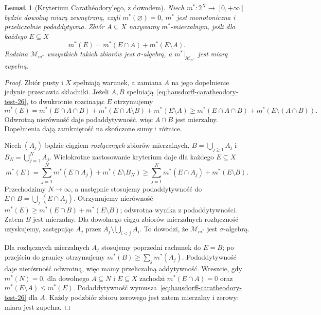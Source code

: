 \documentclass[11pt,a4paper,oneside]{book}
\numberwithin{equation}{chapter}
\theoremstyle{plain}
\newtheorem{lemat}[twierdzenie]{Lemat}
\theoremstyle{definition}
\theoremstyle{remark}
\begin{document}
\begin{lemat}[Kryterium Carathéodory'ego, z dowodem]
\label{lem:hausdorff-caratheodory-selfcontained-26}
Niech $m^*:2^X\to[0,+\infty]$ będzie dowolną
miarą zewnętrzną, czyli $m^*(\varnothing)=0$,
$m^*$ jest monotoniczna i przeliczalnie
podaddytywna. Zbiór $A\subseteq X$ nazywamy
$m^*$-mierzalnym, jeśli dla każdego $E\subseteq X$
\begin{equation}\label{eq:hausdorff-caratheodory-test-26}
 m^*(E)=m^*(E\cap A)+m^*(E\setminus A).
\end{equation}
Rodzina $\mathcal M_{m^*}$ wszystkich takich zbiorów
jest $\sigma$-algebrą, a $m^*|_{\mathcal M_{m^*}}$
jest miarą zupełną.
\end{lemat}
\begin{proof}
Zbiór pusty i $X$ spełniają warunek, a zamiana $A$
na jego dopełnienie jedynie przestawia składniki.
Jeżeli $A,B$ spełniają~\eqref{eq:hausdorff-caratheodory-test-26},
to dwukrotnie rozcinając $E$ otrzymujemy
\[
 m^*(E)=m^*(E\cap A\cap B)
 +m^*(E\cap A\setminus B)+m^*(E\setminus A)
 \geq m^*(E\cap A\cap B)+m^*(E\setminus(A\cap B)).
\]
Odwrotną nierówność daje podaddytywność, więc
$A\cap B$ jest mierzalny. Dopełnienia dają
zamkniętość na skończone sumy i różnice.

Niech $(A_j)$ będzie ciągiem \emph{rozłącznych}
zbiorów mierzalnych, $B=\bigcup_{j\ge1}A_j$
i $B_N=\bigcup_{j=1}^NA_j$. Wielokrotne
zastosowanie kryterium daje dla każdego $E\subseteq X$
\[
 m^*(E)=\sum_{j=1}^Nm^*(E\cap A_j)
 +m^*(E\setminus B_N)
 \geq\sum_{j=1}^Nm^*(E\cap A_j)+m^*(E\setminus B).
\]
Przechodzimy $N\to\infty$, a następnie stosujemy
podaddytywność do $E\cap B=\bigcup_j(E\cap A_j)$.
Otrzymujemy nierówność $m^*(E)\geq
m^*(E\cap B)+m^*(E\setminus B)$;
odwrotna wynika z podaddytywności. Zatem $B$
jest mierzalny. Dla dowolnego ciągu zbiorów
mierzalnych rozłączność uzyskujemy, zastępując
$A_j$ przez $A_j\setminus\bigcup_{i<j}A_i$.
To dowodzi, że $\mathcal M_{m^*}$ jest $\sigma$-algebrą.

Dla rozłącznych mierzalnych $A_j$ stosujemy
poprzedni rachunek do $E=B$; po przejściu
do granicy otrzymujemy
$m^*(B)\geq\sum_jm^*(A_j)$.
Podaddytywność daje nierówność odwrotną,
więc mamy przeliczalną addytywność.
Wreszcie, gdy $m^*(N)=0$, dla dowolnego $A\subseteq N$
i $E\subseteq X$ zachodzi
$m^*(E\cap A)=0$ oraz
$m^*(E\setminus A)\leq m^*(E)$.
Podaddytywność wymusza~\eqref{eq:hausdorff-caratheodory-test-26}
dla $A$. Każdy podzbiór zbioru zerowego jest zatem
mierzalny i zerowy: miara jest zupełna.
\end{proof}
\end{document}
